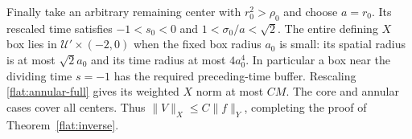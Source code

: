 Finally take an arbitrary remaining center with $r_0^2>\rho_0$ and
choose $a=r_0$. Its rescaled time satisfies $-1<s_0<0$ and
$1<\sigma_0/a<\sqrt2$. The entire defining $X$ box lies in
$\mathcal U'\times(-2,0)$ when the fixed box radius $a_0$ is small:
its spatial radius is at most $\sqrt2a_0$ and its time radius at
most $4a_0^4$. In particular a box near the dividing time $s=-1$
has the required preceding-time buffer. Rescaling
\eqref{flat:annular-full} gives its weighted $X$ norm at most $CM$.
The core and annular cases cover all centers. Thus
$\|V\|_X\le C\|f\|_Y$, completing the proof of
Theorem~\ref{flat:inverse}.
